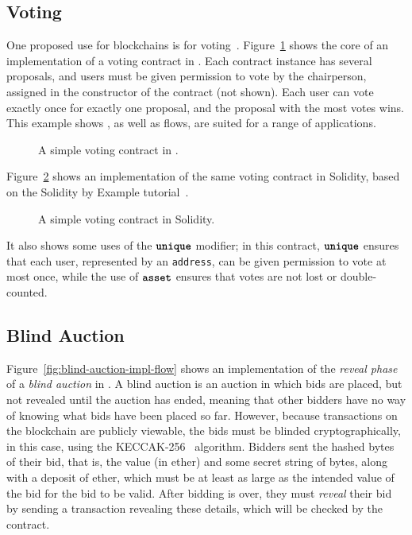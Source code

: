 \documentclass[dvipsnames,runningheads]{llncs}
\begin{document}
\subsection{Voting}\label{sec:voting-impl}
One proposed use for blockchains is for voting~\cite{Elsden18:Making}.
Figure~\ref{fig:voting-impl-flow} shows the core of an implementation of a voting contract in \langName.
Each contract instance has several proposals, and users must be given permission to vote by the chairperson, assigned in the constructor of the contract (not shown).
Each user can vote exactly once for exactly one proposal, and the proposal with the most votes wins.
This example shows \langName, as well as flows, are suited for a range of applications.
\begin{figure}
    \vspace{-2em}
    \centering
    
    \vspace{-1em}
    \caption{A simple voting contract in \langName.}
    \label{fig:voting-impl-flow}
    \vspace{-1em}
\end{figure}

Figure~\ref{fig:voting-impl-sol} shows an implementation of the same voting contract in Solidity, based on the Solidity by Example tutorial~\cite{solidityByExample}.
\begin{figure}
    \vspace{-2em}
    \centering
    
    \vspace{-1em}
    \caption{A simple voting contract in Solidity.}
    \label{fig:voting-impl-sol}
    \vspace{-1em}
\end{figure}
It also shows some uses of the $\textbf{\texttt{unique}}$ modifier; in this contract, $\textbf{\texttt{unique}}$ ensures that each user, represented by an \lstinline{address}, can be given permission to vote at most once, while the use of $\textbf{\texttt{asset}}$ ensures that votes are not lost or double-counted.

\subsection{Blind Auction}\label{sec:blind-auction-impl}
Figure~\ref{fig:blind-auction-impl-flow} shows an implementation of the \emph{reveal phase} of a \emph{blind auction} in \langName.
A blind auction is an auction in which bids are placed, but not revealed until the auction has ended, meaning that other bidders have no way of knowing what bids have been placed so far.
However, because transactions on the blockchain are publicly viewable, the bids must be blinded cryptographically, in this case, using the KECCAK-256~\cite{bertoni2013keccak} algorithm.
Bidders sent the hashed bytes of their bid, that is, the value (in ether) and some secret string of bytes, along with a deposit of ether, which must be at least as large as the intended value of the bid for the bid to be valid.
After bidding is over, they must \emph{reveal} their bid by sending a transaction revealing these details, which will be checked by the  contract.
\end{document}
